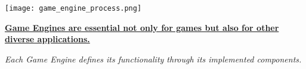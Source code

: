 





\begin{center}
\texttt{[image: game\_engine\_process.png]}
\end{center}



\begin{center}
  \underline{\textbf{Game Engines are essential not only for games but also for other diverse applications.}}

  \emph{Each Game Engine defines its functionality through its implemented components.}
\end{center}


















